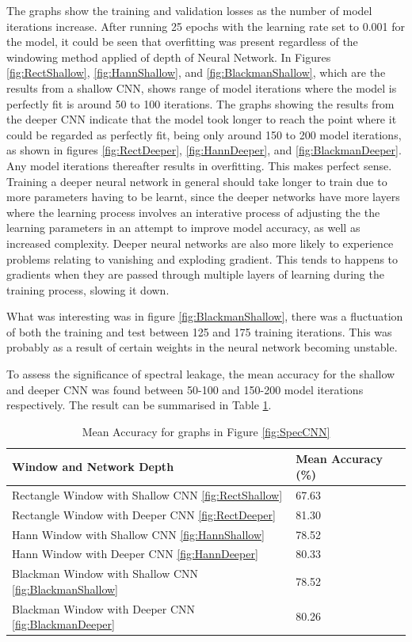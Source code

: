 The graphs show the training and validation losses as the number of model iterations increase. After running 25 epochs with the learning rate set to 0.001 for the model, it could be seen that overfitting was present regardless of the windowing method applied of depth of Neural Network. In Figures \ref{fig:RectShallow}, \ref{fig:HannShallow}, and \ref{fig:BlackmanShallow}, which are the results from a shallow CNN, shows range of model iterations where the model is perfectly fit is around 50 to 100 iterations. The graphs showing the results from the deeper CNN indicate that the model took longer to reach the point where it could be regarded as perfectly fit, being only around 150 to 200 model iterations, as shown in figures \ref{fig:RectDeeper}, \ref{fig:HannDeeper}, and \ref{fig:BlackmanDeeper}. Any model iterations thereafter results in overfitting. This makes perfect sense. Training a deeper neural network in general should take longer to train due to more parameters having to be learnt, since the deeper networks have more layers where the learning process involves an interative process of adjusting the the learning parameters in an attempt to improve model accuracy, as well as increased complexity. Deeper neural networks are also more likely to experience problems relating to vanishing and exploding gradient. This tends to happens to gradients when they are passed through multiple layers of learning during the training process, slowing it down.

What was interesting was in figure \ref{fig:BlackmanShallow}, there was a fluctuation of both the training and test between 125 and 175 training iterations. This was probably as a result of certain weights in the neural network becoming unstable. 

To assess the significance of spectral leakage, the mean accuracy for the shallow and deeper CNN was found between 50-100 and 150-200 model iterations respectively. The result can be summarised in Table \ref{tab:Mean_Acc}. 

\begin{table}[h]
\centering
\begin{tabular}{|l|l|}
\hline
\textbf{Window and Network Depth} & \textbf{Mean Accuracy (\%)} \\
\hline
Rectangle Window with Shallow CNN \ref{fig:RectShallow} & 67.63 \\
Rectangle Window with Deeper CNN \ref{fig:RectDeeper} & 81.30 \\
Hann Window with Shallow CNN \ref{fig:HannShallow} & 78.52 \\
Hann Window with Deeper CNN \ref{fig:HannDeeper} & 80.33 \\
Blackman Window with Shallow CNN \ref{fig:BlackmanShallow} & 78.52 \\
Blackman Window with Deeper CNN \ref{fig:BlackmanDeeper} & 80.26 \\
\hline
\end{tabular}
\caption{Mean Accuracy for graphs in Figure \ref{fig:SpecCNN}}
\label{tab:Mean_Acc}
\end{table}

